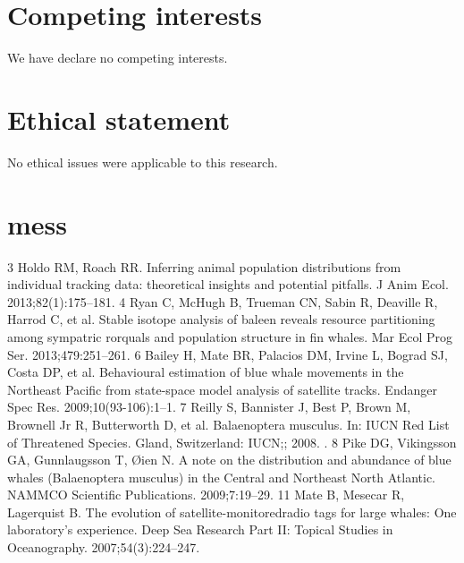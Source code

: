 \documentclass[a4paper,12pt]{article}
\begin{document}
\section{Competing interests}
We have declare no competing interests.

\section{Ethical statement}
No ethical issues were applicable to this research.




\section{mess}
3 Holdo RM, Roach RR. Inferring animal population distributions from
individual tracking data: theoretical insights and potential pitfalls. J Anim Ecol. 2013;82(1):175–181.
4 Ryan C, McHugh B, Trueman CN, Sabin R, Deaville R, Harrod C, et al.
Stable isotope analysis of baleen reveals resource partitioning among
sympatric rorquals and population structure in fin whales. Mar Ecol
Prog Ser. 2013;479:251–261.
6 Bailey H, Mate BR, Palacios DM, Irvine L, Bograd SJ, Costa DP, et al. Behavioural estimation of blue whale movements in the Northeast
Pacific from state-space model analysis of satellite tracks. Endanger Spec Res. 2009;10(93-106):1–1.
7 Reilly S, Bannister J, Best P, Brown M, Brownell Jr R, Butterworth D, et al. Balaenoptera musculus. In: IUCN Red List of Threatened Species.
Gland, Switzerland: IUCN;; 2008. .
8 Pike DG, Vikingsson GA, Gunnlaugsson T, Øien N. A note on the distribution and abundance of blue whales (Balaenoptera musculus) in
the Central and Northeast North Atlantic. NAMMCO Scientific
Publications. 2009;7:19–29.
11 Mate B, Mesecar R, Lagerquist B. The evolution of satellite-monitoredradio tags for large whales: One laboratory’s experience. Deep Sea Research Part II: Topical Studies in Oceanography. 2007;54(3):224–247.
\end{document}
